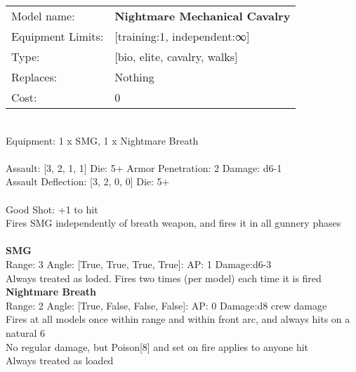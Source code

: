 \noindent
\begin{tabular}{ll}
Model name: &{\bf Nightmare Mechanical Cavalry } \\
Equipment Limits: &[training:1, independent:∞] \\
Type: &[bio, elite, cavalry, walks] \\
Replaces: &Nothing \\
Cost: & 0\\
\end{tabular}
\ \\
Equipment: 1 x SMG, 1 x Nightmare Breath \\
\ \\
Assault: [3, 2, 1, 1] Die: 5+ Armor Penetration: 2 Damage: d6-1 \\
Assault Deflection: [3, 2, 0, 0] Die: 5+\\
\indent  
\ \\
Good Shot: +1 to hit\\ 
Fires SMG independently of breath weapon, and fires it in all gunnery phases\\ 

\ \\
{\bf SMG } \\



Range: 3  Angle: [True, True, True, True]: AP: 1 Damage:d6-3 \\
Always treated as loded. Fires two times (per model) each time it is fired\\ 




{\bf Nightmare Breath } \\



Range: 2  Angle: [True, False, False, False]: AP: 0 Damage:d8 crew damage \\
Fires at all models once within range and within front arc, and always hits on a natural 6\\ 
No regular damage, but Poison[8] and set on fire applies to anyone hit\\ 
Always treated as loaded\\ 




 
\ \\



